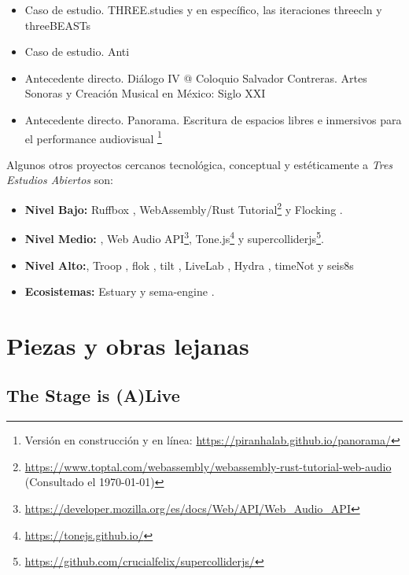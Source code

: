 \begin{itemize}

\item Caso de estudio. THREE.studies \citep{threestudies} y en específico, las iteraciones threecln \citep{threecln} y threeBEASTs \citep{threeBEASTs}
\item Caso de estudio. Anti \citep{anti} 
\item Antecedente directo. Diálogo IV @ Coloquio Salvador Contreras. Artes Sonoras y Creación Musical en México: Siglo XXI \citep{dialogo}
\item Antecedente directo. Panorama. Escritura de espacios libres e inmersivos para el performance audiovisual \citep{panoramaArticulo}\footnote{Versión en construcción y en línea: \url{https://piranhalab.github.io/panorama/}}
  
\end{itemize}

Algunos otros proyectos cercanos tecnológica, conceptual y estéticamente a \textit{Tres Estudios Abiertos} son: 

\begin{itemize}

\item \textbf{Nivel Bajo:} Ruffbox \citep{ruffbox}, WebAssembly/Rust Tutorial\footnote{\url{https://www.toptal.com/webassembly/webassembly-rust-tutorial-web-audio} (Consultado el \today)} y Flocking \citep{flocking}. 
\item \textbf{Nivel Medio:} \citep{supercolliderweb}, Web Audio API\footnote{\url{https://developer.mozilla.org/es/docs/Web/API/Web_Audio_API}}, Tone.js\footnote{\url{https://tonejs.github.io/}} y supercolliderjs\footnote{\url{https://github.com/crucialfelix/supercolliderjs/}}.
\item \textbf{Nivel Alto:}, Troop \citep{Troop}, flok \citep{flok}, tilt \citep{tilt}, LiveLab \citep{livelab}, Hydra \citep{hydra}, timeNot \citep{timenot} y seis8s \citep{seis8s}
\item \textbf{Ecosistemas:} Estuary \citep{estuary} y sema-engine \citep{sema}.
  
\end{itemize}

\section{Piezas y obras lejanas}

\subsection{The Stage is (A)Live}

